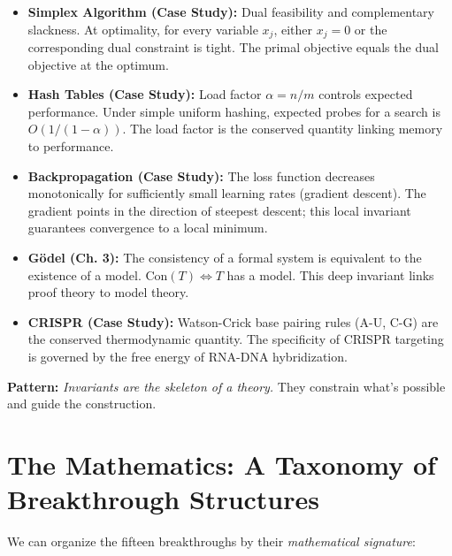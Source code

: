 \begin{itemize}
\item \textbf{Simplex Algorithm (Case Study):} Dual feasibility and complementary slackness. At optimality, for every variable $x_j$, either $x_j = 0$ or the corresponding dual constraint is tight. The primal objective equals the dual objective at the optimum.

\item \textbf{Hash Tables (Case Study):} Load factor $\alpha = n/m$ controls expected performance. Under simple uniform hashing, expected probes for a search is $O(1/(1-\alpha))$. The load factor is the conserved quantity linking memory to performance.

\item \textbf{Backpropagation (Case Study):} The loss function decreases monotonically for sufficiently small learning rates (gradient descent). The gradient points in the direction of steepest descent; this local invariant guarantees convergence to a local minimum.

\item \textbf{G\"odel (Ch. 3):} The consistency of a formal system is equivalent to the existence of a model. $\text{Con}(T) \iff T$ has a model. This deep invariant links proof theory to model theory.

\item \textbf{CRISPR (Case Study):} Watson-Crick base pairing rules (A-U, C-G) are the conserved thermodynamic quantity. The specificity of CRISPR targeting is governed by the free energy of RNA-DNA hybridization.
\end{itemize}

\textbf{Pattern:} \emph{Invariants are the skeleton of a theory.} They constrain what's possible and guide the construction.
\section{The Mathematics: A Taxonomy of Breakthrough Structures}
\label{sec:anatomy:math}

We can organize the fifteen breakthroughs by their \emph{mathematical signature}:

